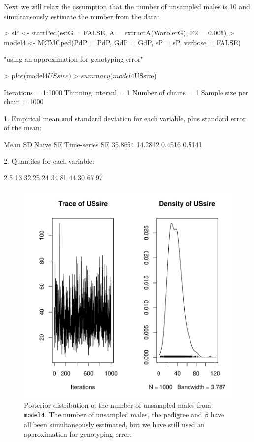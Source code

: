 \documentclass{article}
\begin{document}
Next we will relax the assumption that the number of unsampled males is 10 and simultaneously estimate the number from the data:

\begin{Schunk}
\begin{Sinput}
> sP <- startPed(estG = FALSE, A = extractA(WarblerG), E2 = 0.005)
> model4 <- MCMCped(PdP = PdP, GdP = GdP, sP = sP, verbose = FALSE)
\end{Sinput}
\begin{Soutput}
[1] "using an approximation for genotyping error"
\end{Soutput}
\begin{Sinput}
> plot(model4$USsire)
> summary(model4$USsire)
\end{Sinput}
\begin{Soutput}
Iterations = 1:1000
Thinning interval = 1 
Number of chains = 1 
Sample size per chain = 1000 

1. Empirical mean and standard deviation for each variable,
   plus standard error of the mean:

          Mean             SD       Naive SE Time-series SE 
       35.8654        14.2812         0.4516         0.5141 

2. Quantiles for each variable:

 2.5%
13.32 25.24 34.81 44.30 67.97 
\end{Soutput}
\end{Schunk}


\begin{figure}[!h]
\begin{center}
\includegraphics{Tutorial-030}
\end{center}
\caption{Posterior distribution of the number of unsampled males from \texttt{model4}. The number of unsampled males, the pedigree and $\beta$ have all been simultaneously estimated, but we have still used an approximation for genotyping error.}
\label{model4US-fig}
\end{figure}
\end{document}

